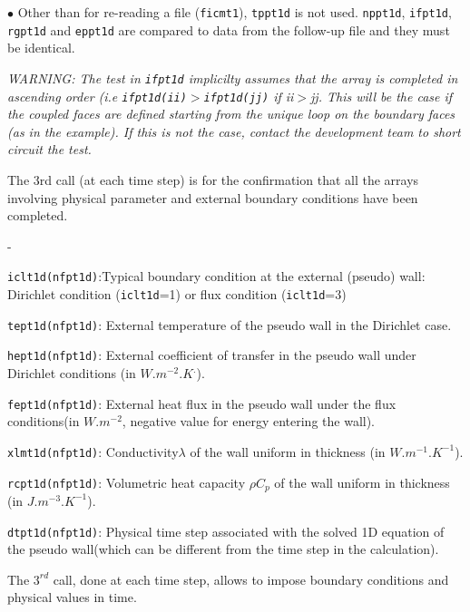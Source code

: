 {{\begin{list}{$\bullet$}{}
Other than for re-reading a file (\texttt{ficmt1}), \texttt{tppt1d} is not used.
\texttt{nppt1d}, \texttt{ifpt1d}, \texttt{rgpt1d} and \texttt{eppt1d} are
compared to data from the follow-up file and they must be identical.

{\em WARNING: The test in \texttt{ifpt1d} implicilty assumes that the array is completed
 in ascending order (i.e \texttt{ifpt1d(ii)}$>$\texttt{ifpt1d(jj)} if ii$>$jj.
 This will be the case if the coupled faces are defined starting from the unique loop on the
boundary faces (as in the example). If this is not the case, contact the development
 team to short circuit the test.}

\item The 3rd call (at each time step) is for the confirmation that all the arrays
 involving physical parameter and external boundary conditions have been completed.
\begin{list}{-}{}
\item \texttt{iclt1d(nfpt1d)}:Typical boundary condition at the external
 (pseudo) wall: Dirichlet condition (\texttt{iclt1d}=1) or flux condition (\texttt{iclt1d}=3)
\item \texttt{tept1d(nfpt1d)}: External temperature of the pseudo wall in the
 Dirichlet case.
\item \texttt{hept1d(nfpt1d)}: External coefficient of transfer in the pseudo
 wall under Dirichlet conditions (in $W.m^{-2}.K^.$).
\item \texttt{fept1d(nfpt1d)}: External heat flux in the pseudo wall under
 the flux conditions(in $W.m^{-2}$, negative value for energy entering the wall).
\item \texttt{xlmt1d(nfpt1d)}: Conductivity$\lambda$ of the wall uniform
in thickness (in $W.m^{-1}.K^{-1}$).
\item \texttt{rcpt1d(nfpt1d)}: Volumetric heat capacity $\rho C_p$ of the
wall uniform in thickness (in $J.m^{-3}.K^{-1}$).
\item \texttt{dtpt1d(nfpt1d)}: Physical time step associated with the solved
 1D equation of the pseudo wall(which can be different from the time step in the
 calculation).
\end{list}

\end{list}

The $3^{rd}$ call, done at each time step, allows to impose boundary conditions
 and physical values in time.

}}
